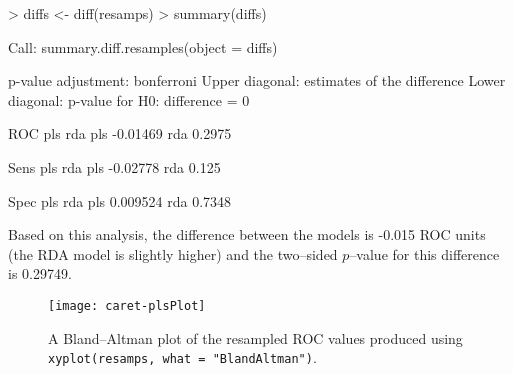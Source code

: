 \documentclass[12pt]{article}
\newcommand{\code}[1]{\mbox{\footnotesize\color{darkblue}\texttt{#1}}}
\renewenvironment{Schunk}{\vspace{\topsep}}{\vspace{\topsep}}
\begin{document}
\begin{Schunk}
\begin{Sinput}
> diffs <- diff(resamps)
> summary(diffs)
\end{Sinput}
\begin{Soutput}
Call:
summary.diff.resamples(object = diffs)

p-value adjustment: bonferroni 
Upper diagonal: estimates of the difference
Lower diagonal: p-value for H0: difference = 0

ROC 
    pls    rda     
pls        -0.01469
rda 0.2975         

Sens 
    pls   rda     
pls       -0.02778
rda 0.125         

Spec 
    pls    rda     
pls        0.009524
rda 0.7348         
\end{Soutput}
\end{Schunk}
Based on this analysis, the difference between the models is -0.015 ROC units (the RDA model is slightly higher) and the two--sided $p$--value for this difference is 0.29749.


\begin{figure}
  \begin{center}  
\texttt{[image: caret-plsPlot]}
    \caption{A Bland--Altman plot of the resampled ROC values produced using 
      \code{xyplot(resamps, what = "BlandAltman")}.  }
    \label{F:BA}         
  \end{center}
\end{figure}   
\end{document}
